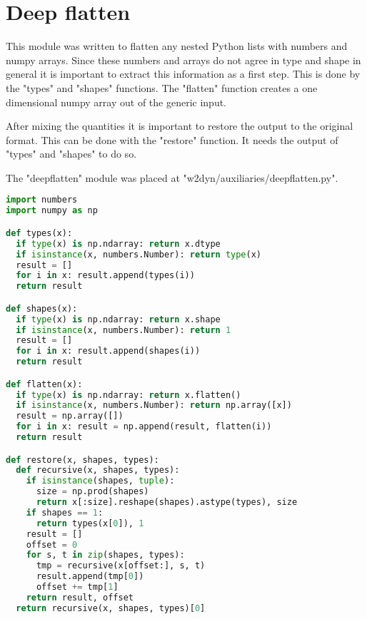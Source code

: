 \section{Deep flatten}
This module was written to flatten any nested Python lists with numbers and numpy arrays. Since these numbers and arrays do not agree in type and shape in general it is important to extract this information as a first step. This is done by the "types" and "shapes" functions. The "flatten" function creates a one dimensional numpy array out of the generic input.

After mixing the quantities it is important to restore the output to the original format. This can be done with the "restore" function. It needs the output of "types" and "shapes" to do so.

The "deepflatten" module was placed at "w2dyn/auxiliaries/deepflatten.py".

\begin{lstlisting}[label=lst:deepflat, language=python, caption=deepflatten.py]
import numbers
import numpy as np

def types(x):
  if type(x) is np.ndarray: return x.dtype
  if isinstance(x, numbers.Number): return type(x)
  result = []
  for i in x: result.append(types(i))
  return result

def shapes(x):
  if type(x) is np.ndarray: return x.shape
  if isinstance(x, numbers.Number): return 1
  result = []
  for i in x: result.append(shapes(i))
  return result

def flatten(x):
  if type(x) is np.ndarray: return x.flatten()
  if isinstance(x, numbers.Number): return np.array([x])
  result = np.array([])
  for i in x: result = np.append(result, flatten(i))
  return result

def restore(x, shapes, types):
  def recursive(x, shapes, types):
    if isinstance(shapes, tuple):
      size = np.prod(shapes)
      return x[:size].reshape(shapes).astype(types), size
    if shapes == 1:
      return types(x[0]), 1
    result = []
    offset = 0
    for s, t in zip(shapes, types):
      tmp = recursive(x[offset:], s, t)
      result.append(tmp[0])
      offset += tmp[1]
    return result, offset
  return recursive(x, shapes, types)[0]
\end{lstlisting}

